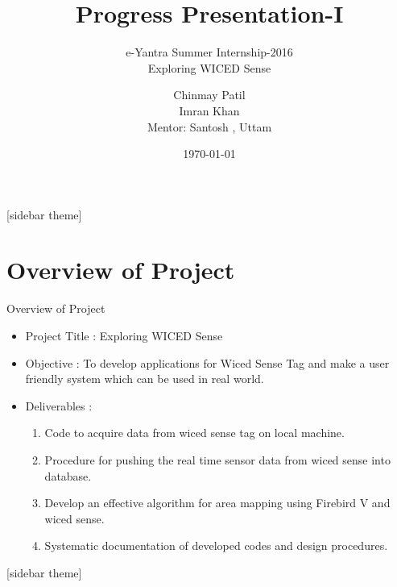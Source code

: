 \documentclass[10pt, a4paper]{beamer}
\begin{document}
	\title{Progress Presentation-I}
	\subtitle{e-Yantra Summer Internship-2016 \\ \vspace{2mm}Exploring WICED Sense }
	\author{Chinmay Patil\\Imran Khan\\ \vspace{5mm}
	Mentor: Santosh , Uttam }
	\date{\today}
	
	\frame{\titlepage}

[sidebar theme]
\section{Overview of Project}
\begin{frame}{Overview of Project}
	\begin{itemize}
		\item Project Title : Exploring WICED Sense
		\item Objective : To develop applications for Wiced Sense Tag and make a user friendly system which can be used in real world.
		\item Deliverables : \begin{enumerate}
		      \item Code to acquire data from wiced sense tag on local machine.
		      \item Procedure for pushing the real time sensor data from wiced sense into database.
		      \item Develop an effective algorithm for area mapping using Firebird V and wiced sense.
		      \item Systematic documentation of developed codes and design procedures.
		\end{enumerate}
	\end{itemize}
\end{frame}

[sidebar theme]
\end{document}
